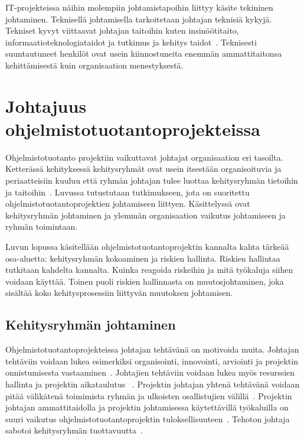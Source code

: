 \documentclass[finnish]{tktltiki2}
\theoremstyle{definition}
\theoremstyle{remark}
\begin{document}
IT-projekteissa näihin molempiin johtamistapoihin liittyy käsite tekininen johtaminen. Teknisellä johtamisella tarkoitetaan johtajan teknisiä kykyjä. Tekniset kyvyt viittaavat johtajan taitoihin kuten insinöötitaito, informaatioteknologiataidot ja tutkimus ja kehitys taidot~\cite{thite2000leadership}. Teknisesti suuntautuneet henkilöt ovat usein kiinnostuneita enemmän ammattitaitonsa kehittämisestä kuin organisaation menestyksestä. 
   



  


\section{Johtajuus ohjelmistotuotantoprojekteissa}

Ohjelmistotuotanto projektiin vaikuttavat johtajat organisaation eri tasoilta. Ketterässä kehityksessä kehitysryhmät ovat usein itsestään organisoituvia ja periaatteisiin kuuluu että ryhmän johtajan tulee luottaa kehitysryhmän tietoihin ja taitoihin~\cite{fowler2001agile}. Luvussa tutustutaan tutkimukseen, jota on suoritettu ohjelmistotuotantoprojektien johtamiseen liittyen. Käsittelyssä ovat kehitysryhmän johtaminen ja ylemmän organisaation vaikutus johtamiseen ja ryhmän toimintaan.

Luvun lopussa käsitellään ohjelmistotuotantoprojektin kannalta kahta tärkeää osa-aluetta: kehitysryhmän kokoaminen ja riskien hallinta. Riskien hallintaa tutkitaan kahdelta kannalta. Kuinka reagoida riskeihin ja mitä työkaluja siihen voidaan käyttää. Toinen puoli riskien hallinnasta on muutosjohtaminen, joka sisältää koko kehitysprosessiin liittyvän muutoksen johtamisen.

\subsection{Kehitysryhmän johtaminen}

Ohjelmistotuotantoprojekteissa johtajan tehtävänä on motivoida muita. Johtajan tehtäviin voidaan lukea esimerkiksi organisointi, innovointi, arviointi ja projektin onnistumisesta vastaaminen~\cite{4017705}. Johtajien tehtäviin voidaan lukea myös resurssien hallinta ja projektin aikataulutus ~\cite{Dhomne:2012:ITL:2382887.2382899}. Projektin johtajan yhtenä tehtävänä voidaan pitää välikätenä toimimista ryhmän ja ulkoisten osallistujien välillä~\cite{McLeod:2011:FAS:1978802.1978803}. Projektin johtajan ammattitaidolla ja projektin johtamisessa käytettävillä työkaluilla on suuri vaikutus ohjelmistotuotantoprojektin tuloksellisuuteen~\cite{McLeod:2011:FAS:1978802.1978803}. Tehoton johtaja sabotoi kehitysryhmän tuottavuutta~\cite{bradley1997effect}.
\end{document}
